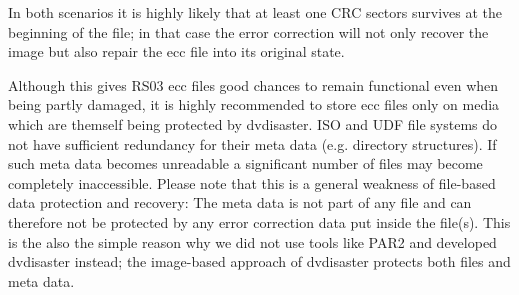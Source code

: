 In both scenarios it is highly likely that at least one CRC sectors survives
at the beginning of the file; in that case the error correction will not
only recover the image but also repair the ecc file into its original state.

\bigskip

Although this gives RS03 ecc files good chances to remain functional even
when being partly damaged, it is highly recommended to store ecc files 
only on media which are themself being protected by dvdisaster. 
ISO and UDF file systems
do not have sufficient redundancy for their meta data (e.g. directory
structures). If such meta data becomes unreadable a significant
number of files may become completely inaccessible. 
Please note that this is a
general weakness of file-based data protection and recovery: The
meta data is not part of any file and can therefore not be protected by
any error correction data put inside the file(s). 
\smallskip
This is the also the simple reason why we did not use tools like PAR2 
and developed dvdisaster instead; 
the image-based approach of dvdisaster protects
both files and meta data.



